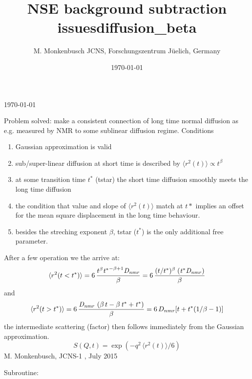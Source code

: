 \documentclass[12pt]{article}
\title{NSE background subtraction issues}
\author{M. Monkenbusch 
JCNS, Forschungszentrum J\"uelich, Germany}
\date{\today}
\newcommand{\myspace}{\vskip 0.4cm}
\begin{document}
\title{diffusion\_beta}
%
\today

Problem solved:
make a consistent connection of long time normal diffusion as e.g. measured by NMR to
some sublinear diffusion regime.
\myspace
Conditions
\begin{enumerate}
\item Gaussian approximation is valid
\item sub/super-linear diffusion at short time is described by $\langle r^2(t) \rangle \propto t^\beta$
\item at some transition time $t^*$ (tstar) the short time diffusion smoothly meets the long time diffusion
\item the condition that value and slope of  $\langle r^2(t) \rangle$ match at $t*$ implies an offset for
the mean square displacement in the long time behaviour.
\item besides the streching exponent $\beta$, tstar ($t^*$) is the only additional free parameter.
\end{enumerate}

After a few operation we the arrive at:
\begin{equation}
\label{eq:difbeta1}
 \langle r^2(t<t^*) \rangle = 6\,{\frac {{t}^{\beta}{{\it t^*}}^{-\beta+1}{\it D_{nmr}}}{\beta}} =
                              6\,{\frac {(t/t^*)^{\beta}\;({{\it t^*}}{\it D_{nmr})}}{\beta}}
\end{equation}
and
\begin{equation}
\label{eq:difbeta2}
 \langle r^2(t>t^*) \rangle = 6\,{\frac {{\it D_{nmr}}\, \left( \beta\,t-\beta\,{\it t^*}+{\it t^*}
 \right) }{\beta}}
= 
6\,D_{nmr}[t + t^* (1/\beta -1)] 
\end{equation}
the intermediate scattering (factor) then follows immediately from the Gaussian approximation.
\begin{equation}
S(Q,t) = \exp(-q^2 \,  \langle r^2(t) \rangle /6)
\end{equation}
\vskip 0.5cm
\hline
\vskip 0.5cm
M. Monkenbusch, JCNS-1 , July 2015

\vskip 1cm
\hline

Subroutine:
\end{document}
